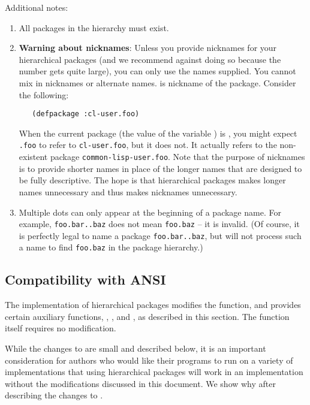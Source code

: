 Additional notes:

\begin{enumerate}
\item
All packages in the hierarchy must exist.

\item
\textbf{Warning about nicknames}: Unless you provide nicknames for
your hierarchical packages (and we recommend against doing so because
the number gets quite large), you can only use the names supplied. You
cannot mix in nicknames or alternate names. 
is nickname of the  package.
Consider the following:

\begin{verbatim}
   (defpackage :cl-user.foo)
\end{verbatim}
  
When the current package (the value of the variable )
is , you might expect \verb|.foo| to refer to
\verb|cl-user.foo|, but it does not. It actually refers to the non-existent
package \verb|common-lisp-user.foo|. Note that the purpose of
nicknames is to provide shorter names in place of the longer names
that are designed to be fully descriptive. The hope is that
hierarchical packages makes longer names unnecessary and thus makes
nicknames unnecessary.

\item
Multiple dots can only appear at the beginning of a package name. For
example, \verb|foo.bar..baz| does not mean \verb|foo.baz| -- it is
invalid. (Of course, it is perfectly legal to name a package
\verb|foo.bar..baz|, but  will not process such
a name to find \verb|foo.baz| in the package hierarchy.)
\end{enumerate}


\subsection{Compatibility with ANSI \clisp{}}

The implementation of hierarchical packages modifies the
 function, and provides certain auxiliary
functions, , , and
, as described in this section.
The function  itself requires no modification.

While the changes to  are small and described
below, it is an important consideration for authors who would like
their programs to run on a variety of implementations that using
hierarchical packages will work in an implementation without the
modifications discussed in this document. We show why after
describing the changes to .

